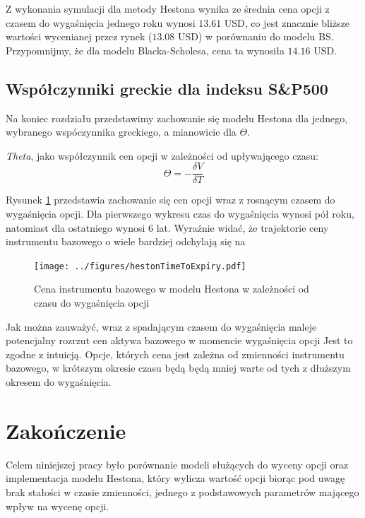 \documentclass{pracamgr}
\begin{document}
Z wykonania symulacji dla metody Hestona wynika ze średnia cena opcji z czasem do wygaśnięcia jednego roku wynosi $13.61$ USD, 
co jest znacznie bliższe wartości wycenianej przez rynek ($13.08$ USD) w porównaniu do modelu BS. 
Przypomnijmy, że dla modelu Blacka-Scholesa, cena ta wynosiła $14.16$ USD.



\section{Współczynniki greckie dla indeksu S\&P500}


Na koniec rozdziału przedstawimy zachowanie się modelu Hestona dla jednego, wybranego wspóczynnika greckiego, 
a mianowicie dla $\Theta$.

\textit{Theta}, jako współczynnik cen opcji w zależności od upływającego czasu:
\begin{equation}
  \Theta = - \frac{\delta V}{\delta T}
\end{equation}

Rysunek \ref{fig:hestonTimeToExpiry} przedstawia zachowanie się cen opcji wraz z rosnącym czasem do 
wygaśnięcia opcji. Dla pierwszego wykresu czas do wygaśnięcia wynosi pół roku, natomiast dla ostatniego 
wynosi 6 lat. Wyraźnie widać, że trajektorie ceny instrumentu bazowego o wiele bardziej odchylają się 
na 
\begin{figure}
  \texttt{[image: ../figures/hestonTimeToExpiry.pdf]}
  \caption{Cena instrumentu bazowego w modelu Hestona w zależności od czasu do wygaśnięcia opcji}
  \label{fig:hestonTimeToExpiry}
\end{figure}

Jak można zauważyć, wraz z spadającym czasem do wygaśnięcia maleje potencjalny rozrzut cen aktywa bazowego w momencie wygaśnięcia opcji
Jest to zgodne z intuicją. Opcje, których cena jest zależna od zmienności instrumentu bazowego, 
w krótszym okresie czasu będą będą mniej warte od tych z dłuższym okresem do wygaśnięcia.


 \chapter*{Zakończenie}\label{r:ending}

Celem niniejszej pracy było porównanie modeli służących do wyceny
opcji oraz implementacja modelu Hestona, który wylicza wartość opcji biorąc
pod uwagę brak stałości w czasie zmienności, jednego z podstawowych parametrów
mającego wpływ na wycenę opcji. 
\end{document}
